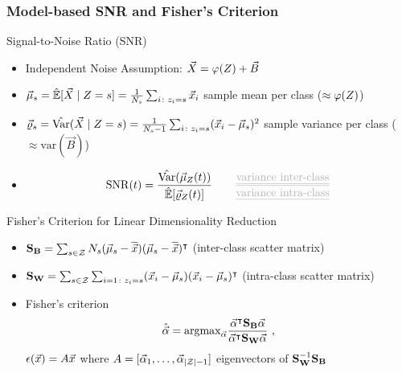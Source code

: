\begin{frame}
\frametitle{Model-based SNR and Fisher's Criterion}
\vspace*{-12pt}
\begin{block}{Signal-to-Noise Ratio (SNR)}
\begin{itemize}
\item Independent Noise Assumption: $\vec{X} = \varphi(Z)+\vec{B}$

\item $\mmmXclass= \esperEst[\given{\vaLeakVec}{\sensRandVar = \sensVarGenValue}] = \frac{1}{\nbTracesPerClass}\sum_{i\colon \sensVar_i=\sensVarGenValue} \vLeakVec_i $ sample mean per class ($\approx \varphi(Z)$)
\item $\varXclass = \varEst(\given{\vaLeakVec}{\sensRandVar = \sensVarGenValue}) = \frac{1}{\nbTracesPerClass-1}\sum_{i\colon \sensVar_i=\sensVarGenValue} (\vLeakVec_i - \mmmXclass)^2 $ sample variance per class ($\approx \mathrm{var}(\vec{B})$) 
\item \begin{equation*}\mathrm{SNR}(t) = \frac{\varEst(\mmmXclass[Z](t))}{\esperEst[\varXclass[Z](t)]} \qquad \textcolor{grey}{\frac{\text{\emph{variance inter-class}}}{\text{\emph{variance intra-class}}}} \end{equation*}
\end{itemize}
\end{block}

\begin{block}{Fisher's Criterion for Linear Dimensionality Reduction}

\begin{itemize}
\item $\textbf{S}_{\textbf{B}} = \sum_{s\in\mathcal{Z}}N_{s}(\vec{\mu}_{s}-\overline{\vec{x}})(\vec{\mu}_{s}-\overline{\vec{x}})^\intercal $ (inter-class scatter matrix)
\item $\textbf{S}_{\textbf{W}} = \sum_{s\in\mathcal{Z}}\sum_{i=1\colon z_i=s}(\vec{x}_i-\vec{\mu}_{s})(\vec{x}_i-\vec{\mu}_{s})^\intercal$ (intra-class scatter matrix)
\item Fisher's criterion
 \begin{equation}\label{eq:LDA}
\hat{ \vec{\alpha}}=\mathrm{argmax}_{\vec{\alpha}} \frac{\vec{\alpha}^\intercal \textbf{S}_{\textbf{B}} \vec{\alpha}}{\vec{\alpha}^\intercal \textbf{S}_{\textbf{W}} \vec{\alpha}} \mbox{ ,}
 \end{equation}
 $\epsilon(\vec{x}) = A\vec{x} $ where $A=[\vec{\alpha}_1, \dots, \vec{\alpha}_{|\mathcal{Z}|-1}]$ eigenvectors of $\textbf{S}_{\textbf{W}}^{-1}\textbf{S}_{\textbf{B}}$
\end{itemize}

\end{block}
\end{frame}

